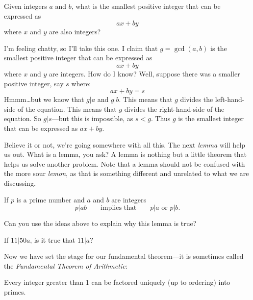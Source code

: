 \begin{question} 
Given integers $a$ and $b$, what is the smallest positive integer that
can be expressed as
\[
ax + by
\]
where $x$ and $y$ are also integers?
\end{question}

 
I'm feeling chatty, so I'll take this one. I claim that $g =
\gcd(a,b)$ is the smallest positive integer that can be
expressed as
\[
ax + by
\]
where $x$ and $y$ are integers. How do I know? Well, suppose there was
a smaller positive integer, say $s$ where:
\[
ax + by = s
\]
Hmmm\dots but we know that $g|a$ and $g|b$. This means that $g$
divides the left-hand-side of the equation. This means that $g$
divides the right-hand-side of the equation. So $g|s$---but this is
impossible, as $s< g$. Thus $g$ is the smallest integer that can be
expressed as $ax +by$.


Believe it or not, we're going somewhere with all this. The next
\textit{lemma} will help us out.  What is a lemma, you
ask? A lemma is nothing but a little theorem that helps us solve
another problem. Note that a lemma should not be confused with the
more sour \textit{lemon}, as that is something
different and unrelated to what we are discussing.

\begin{lemma} 
If $p$ is a prime number and $a$ and $b$ are integers
\[
p|ab \qquad\text{implies that} \qquad p | a\text{ or } p|b.
\]
\end{lemma}

\begin{question} Can you use the ideas above to explain why this lemma is true?
\end{question}
\QM



\begin{question} If $11 | 50a$, is it true that $11|a$?
\end{question}
\QM




Now we have set the stage for our fundamental theorem---it is
sometimes called the \textit{Fundamental Theorem of Arithmetic}:


\begin{theorem}
Every integer greater than 1 can be factored uniquely (up to ordering)
into primes.
\end{theorem}

